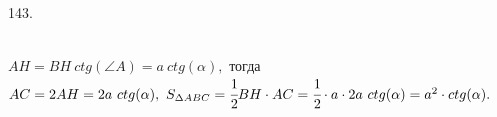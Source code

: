 143. \begin{figure}[ht!]
\end{figure}\\
$AH=BH\ ctg(\angle A)=a\ ctg(\alpha),$ тогда $AC=2AH=2a\ ctg(\alpha),\ S_{\Delta ABC}=\cfrac{1}{2}BH\cdot AC=\cfrac{1}{2}\cdot a \cdot2a\ ctg(\alpha)=a^2\cdot ctg(\alpha).$\newpage\noindent
